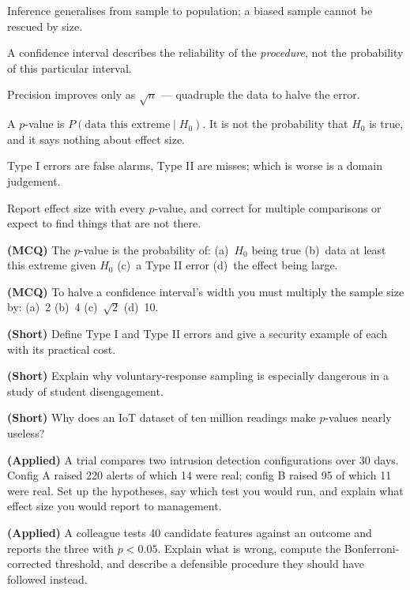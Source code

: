 \begin{chaptersummary}
\begin{tight}
  \item Inference generalises from sample to population; a biased sample cannot be
        rescued by size.
  \item A confidence interval describes the reliability of the \emph{procedure},
        not the probability of this particular interval.
  \item Precision improves only as $\sqrt{n}$ --- quadruple the data to halve the
        error.
  \item A $p$-value is $P(\text{data this extreme} \mid H_0)$. It is not the
        probability that $H_0$ is true, and it says nothing about effect size.
  \item Type I errors are false alarms, Type II are misses; which is worse is a
        domain judgement.
  \item Report effect size with every $p$-value, and correct for multiple
        comparisons or expect to find things that are not there.
\end{tight}
\end{chaptersummary}

\begin{reviewq}
  \item \textbf{(MCQ)} The $p$-value is the probability of: (a)~$H_0$ being true
        (b)~data at least this extreme given $H_0$ (c)~a Type II error
        (d)~the effect being large.
  \item \textbf{(MCQ)} To halve a confidence interval's width you must multiply the
        sample size by: (a)~2 (b)~4 (c)~$\sqrt{2}$ (d)~10.
  \item \textbf{(Short)} Define Type I and Type II errors and give a security
        example of each with its practical cost.
  \item \textbf{(Short)} Explain why voluntary-response sampling is especially
        dangerous in a study of student disengagement.
  \item \textbf{(Short)} Why does an IoT dataset of ten million readings make
        $p$-values nearly useless?
  \item \textbf{(Applied)} A trial compares two intrusion detection configurations
        over 30 days. Config A raised 220 alerts of which 14 were real; config B
        raised 95 of which 11 were real. Set up the hypotheses, say which test you
        would run, and explain what effect size you would report to management.
  \item \textbf{(Applied)} A colleague tests 40 candidate features against an
        outcome and reports the three with $p < 0.05$. Explain what is wrong,
        compute the Bonferroni-corrected threshold, and describe a defensible
        procedure they should have followed instead.
\end{reviewq}

